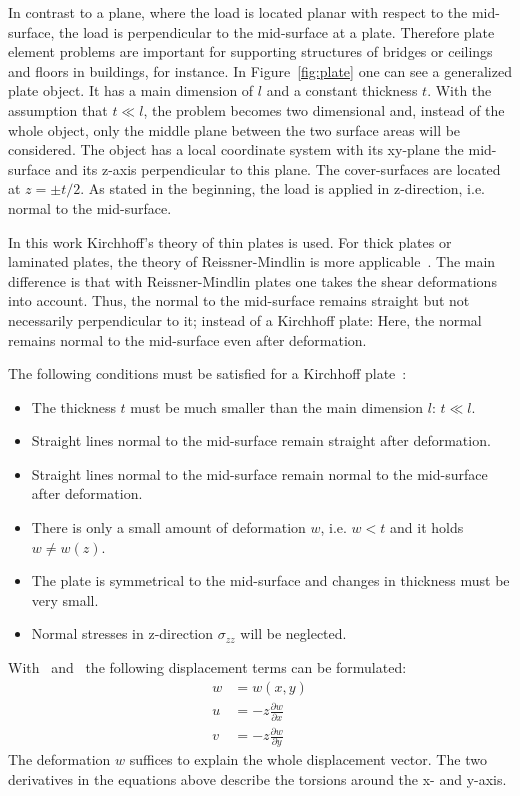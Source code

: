   In contrast to a plane, where the load is located planar with respect to the mid-surface, the load is perpendicular to the mid-surface at a plate. Therefore plate element problems are important for supporting structures of bridges or ceilings and floors in buildings, for instance. In Figure~\ref{fig:plate} one can see a generalized plate object. It has a main dimension of $l$ and a constant thickness $t$. With the assumption that $t \ll l$, the problem becomes two dimensional and, instead of the whole object, only the middle plane between the two surface areas will be considered. The object has a local coordinate system with its xy-plane the mid-surface and its z-axis perpendicular to this plane. The cover-surfaces are located at $z = \pm t/2$. As stated in the beginning, the load is applied in z-direction, i.e. normal to the mid-surface.
  
  In this work Kirchhoff's theory of thin plates is used. For thick plates or laminated plates, the theory of Reissner-Mindlin is more applicable~\cite{werkle1995finite}. The main difference is that with Reissner-Mindlin plates one takes the shear deformations into account. Thus, the normal to the mid-surface remains straight but not necessarily perpendicular to it; instead of a Kirchhoff plate: Here, the normal remains normal to the mid-surface even after deformation.
  
  The following conditions must be satisfied for a Kirchhoff plate~\cite{steinke2005finite}:
  \begin{itemize}
  	\item The thickness $t$ must be much smaller than the main dimension $l$: $t \ll l$.
  	\item Straight lines normal to the mid-surface remain straight after deformation.
  	\item Straight lines normal to the mid-surface remain normal to the mid-surface after deformation.
  	\item There is only a small amount of deformation $w$, i.e. $w < t$ and it holds $w \ne w(z)$.
  	\item The plate is symmetrical to the mid-surface and changes in thickness must be very small.
  	\item Normal stresses in z-direction $\sigma_{zz}$ will be neglected.
  \end{itemize}
  
  With~\cite{klein2013fem} and~\cite{steinke2005finite} the following displacement terms can be formulated:
  \begin{align}
  w &= w(x,y) \\
  u &= -z \frac{\partial w}{\partial x}\\
  v &= -z \frac{\partial w}{\partial y}
  \end{align}
  The deformation $w$ suffices to explain the whole displacement vector. The two derivatives in the equations above describe the torsions around the x- and y-axis.

